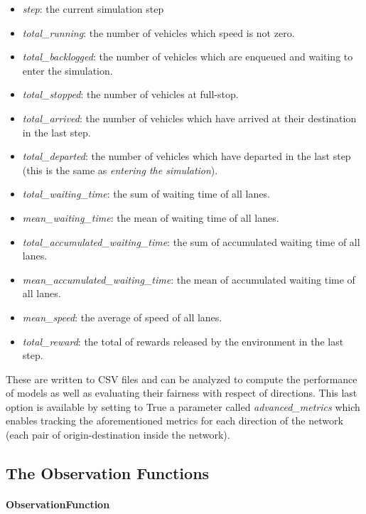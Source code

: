 \begin{itemize}
  \begin{itemize}
    \item \textit{step}: the current simulation step
    \item \textit{total\_running}: the number of vehicles which speed is not zero.
    \item \textit{total\_backlogged}: the number of vehicles which are enqueued and waiting to enter the simulation.
    \item \textit{total\_stopped}: the number of vehicles at full-stop.
    \item \textit{total\_arrived}: the number of vehicles which have arrived at their destination in the last step.
    \item \textit{total\_departed}: the number of vehicles which have departed in the last step (this is the same as \textit{entering the simulation}).
    \item \textit{total\_waiting\_time}: the sum of waiting time of all lanes.
    \item \textit{mean\_waiting\_time}: the mean of waiting time of all lanes.
    \item \textit{total\_accumulated\_waiting\_time}: the sum of accumulated waiting time of all lanes.
    \item \textit{mean\_accumulated\_waiting\_time}: the mean of accumulated waiting time of all lanes.
    \item \textit{mean\_speed}: the average of speed of all lanes.
    \item \textit{total\_reward}: the total of rewards released by the environment in the last step.
  \end{itemize}
  These are written to CSV files and can be analyzed to compute the performance of models as well as evaluating their fairness with respect of directions. This last option is available by setting to True a parameter called \textit{advanced\_metrics} which enables tracking the aforementioned metrics for each direction of the network (each pair of origin-destination inside the network).
\end{itemize}

\subsection{The Observation Functions}

\paragraph{ObservationFunction}

